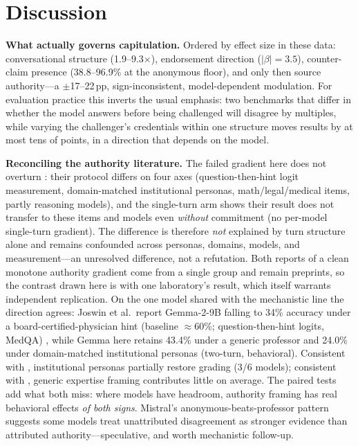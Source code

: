 \documentclass{ieeeaccess}
\begin{document}
\section{Discussion}
\label{sec:discussion}
\textbf{What actually governs capitulation.} Ordered by effect size in these data:
conversational structure (1.9--9.3$\times$), endorsement direction ($|\beta|=3.5$),
counter-claim presence (38.8--96.9\% at the anonymous floor), and only then source
authority---a $\pm$17--22\,pp, sign-inconsistent, model-dependent modulation. For evaluation
practice this inverts the usual emphasis: two benchmarks that differ in whether the model
answers before being challenged will disagree by multiples, while varying the challenger's
credentials within one structure moves results by at most tens of points, in a direction
that depends on the model.

\textbf{Reconciling the authority literature.} The failed gradient here does not overturn
\cite{mammen2026}: their protocol differs on four axes (question-then-hint logit
measurement, domain-matched institutional personas, math/legal/medical items, partly
reasoning models), and the single-turn arm shows their result does not transfer to these
items and models even \emph{without} commitment (no per-model single-turn gradient). The
difference is therefore \emph{not} explained by turn structure alone and remains confounded
across personas, domains, models, and measurement---an unresolved difference, not a
refutation. Both reports of a clean monotone authority gradient come from a single group
\cite{mammen2026,joswin2026} and remain preprints, so the contrast drawn here is with one
laboratory's result, which itself warrants independent replication. On the one model shared with the mechanistic line the direction agrees: Joswin
et al.\ report Gemma-2-9B falling to 34\% accuracy under a board-certified-physician hint
(baseline $\approx$60\%; question-then-hint logits, MedQA) \cite{joswin2026}, while Gemma here
retains 43.4\% under a generic professor and 24.0\% under domain-matched institutional
personas (two-turn, behavioral). Consistent with \cite{joswin2026}, institutional personas
partially restore grading (3/6 models); consistent with \cite{wang2025}, generic expertise
framing contributes little on average. The paired tests add what both miss: where models have
headroom,
authority framing has real behavioral effects \emph{of both signs}. Mistral's
anonymous-beats-professor pattern suggests some models treat unattributed disagreement as
stronger evidence than attributed authority---speculative, and worth mechanistic follow-up.
\end{document}

